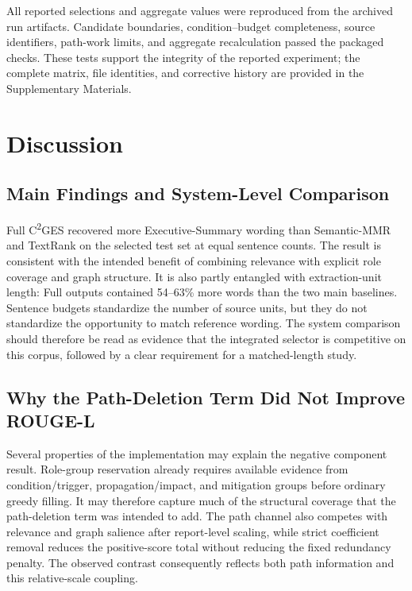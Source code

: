 \documentclass[applsci,article,submit,moreauthors]{Definitions/mdpi}
\newcommand{\cges}{C\textsuperscript{2}GES}
\begin{document}
All reported selections and aggregate values were reproduced from the archived run artifacts. Candidate boundaries, condition--budget completeness, source identifiers, path-work limits, and aggregate recalculation passed the packaged checks. These tests support the integrity of the reported experiment; the complete matrix, file identities, and corrective history are provided in the Supplementary Materials.

\section{Discussion}

\subsection{Main Findings and System-Level Comparison}

Full \cges{} recovered more Executive-Summary wording than Semantic-MMR and TextRank on the selected test set at equal sentence counts. The result is consistent with the intended benefit of combining relevance with explicit role coverage and graph structure. It is also partly entangled with extraction-unit length: Full outputs contained 54--63\% more words than the two main baselines. Sentence budgets standardize the number of source units, but they do not standardize the opportunity to match reference wording. The system comparison should therefore be read as evidence that the integrated selector is competitive on this corpus, followed by a clear requirement for a matched-length study.

\subsection{Why the Path-Deletion Term Did Not Improve ROUGE-L}

Several properties of the implementation may explain the negative component result. Role-group reservation already requires available evidence from condition/trigger, propagation/impact, and mitigation groups before ordinary greedy filling. It may therefore capture much of the structural coverage that the path-deletion term was intended to add. The path channel also competes with relevance and graph salience after report-level scaling, while strict coefficient removal reduces the positive-score total without reducing the fixed redundancy penalty. The observed contrast consequently reflects both path information and this relative-scale coupling.
\end{document}
